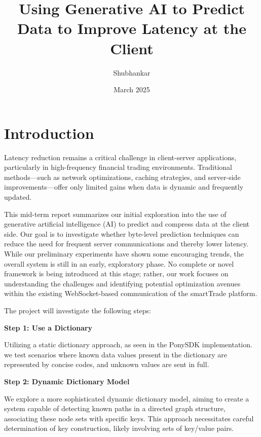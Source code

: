 \documentclass[a4paper, 11pt, twoside, openright]{report}
\author{Shubhankar}
\title{Using Generative AI to Predict Data to Improve Latency at the Client}
\date{March 2025}
\begin{document}
    \pagedegarde

    \cleardoublepage
            \tableofcontents


\chapter{Introduction}
Latency reduction remains a critical challenge in client-server applications, particularly in high-frequency financial trading environments. Traditional methods—such as network optimizations, caching strategies, and server-side improvements—offer only limited gains when data is dynamic and frequently updated.

This mid-term report summarizes our initial exploration into the use of generative artificial intelligence (AI) to predict and compress data at the client side. Our goal is to investigate whether byte-level prediction techniques can reduce the need for frequent server communications and thereby lower latency. While our preliminary experiments have shown some encouraging trends, the overall system is still in an early, exploratory phase. No complete or novel framework is being introduced at this stage; rather, our work focuses on understanding the challenges and identifying potential optimization avenues within the existing WebSocket-based communication of the smartTrade platform.

The project will investigate the following steps:

\textbf{Step 1: Use a Dictionary}

Utilizing a static dictionary approach, as seen in the PonySDK implementation. we test scenarios where known data values present in the dictionary are represented by concise codes, and unknown values are sent in full.

\textbf{Step 2: Dynamic Dictionary Model}

We explore a more sophisticated dynamic dictionary model, aiming to create a system capable of detecting known paths in a directed graph structure, associating these node sets with specific keys. This approach necessitates careful determination of key construction, likely involving sets of key/value pairs.
\end{document}
